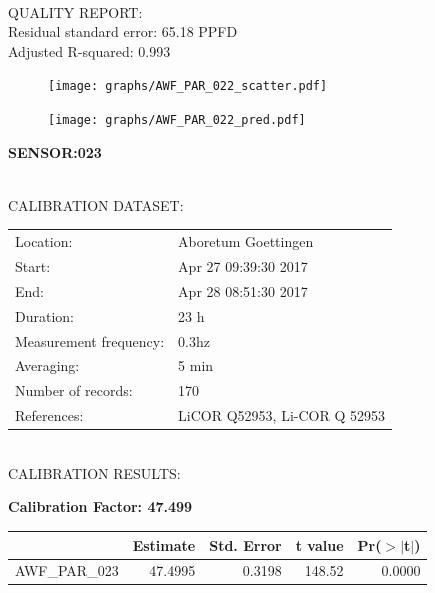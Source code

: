 \documentclass[oneside]{report}
\begin{document}
\hrulefill\\
QUALITY REPORT:\\
Residual standard error: 65.18 PPFD\\
Adjusted R-squared: 0.993



\begin{figure}[H]
  \centering
  \texttt{[image: graphs/AWF\_PAR\_022\_scatter.pdf]}
\end{figure}




\begin{figure}[H]
  \centering
  \texttt{[image: graphs/AWF\_PAR\_022\_pred.pdf]}
\end{figure}

\pagebreak


\begin{center}
\large{\textbf{SENSOR:023}}\\
\end{center}

\hrulefill\\
CALIBRATION DATASET:\\
\begin{table}[h!]
  \centering
  \label{tab:table1}
  \begin{tabular}{ll}
    Location: & Aboretum Goettingen\\ 
    
    
    Start:  & Apr 27 09:39:30 2017 \\
    End:   & Apr 28 08:51:30 2017\\ 
    Duration: & 23 h\\
    Measurement frequency: & 0.3hz\\
    Averaging:  &5 min\\
    Number of records: & 170 \\
    References: & LiCOR Q52953, Li-COR Q 52953 \\
  \end{tabular}
\end{table}

\hrulefill\\
CALIBRATION RESULTS:\\


\begin{center}
\textbf{\large{Calibration Factor: 47.499}}\\
\end{center}
\begin{table}[ht]
\centering
\begin{tabular}{rrrrr}
  \hline
 & Estimate & Std. Error & t value & Pr($>$$|$t$|$) \\ 
  \hline
AWF\_PAR\_023 & 47.4995 & 0.3198 & 148.52 & 0.0000 \\ 
   \hline
\end{tabular}
\end{table}
\end{document}
